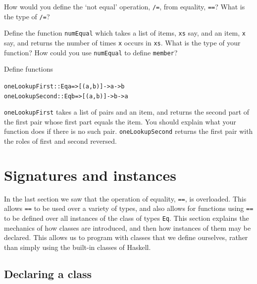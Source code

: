 \begin{exercises}

\item
How would you define the `not equal'
operation, \texttt{/=}, from equality, \texttt{==}? What is the type of
\texttt{/=}?

\item
Define the function \texttt{numEqual} which takes a list of items, \texttt{xs} say,
and an item, \texttt{x} say, and returns the number of times \texttt{x} occurs in
\texttt{xs}. What is the type of your function? How could you use \texttt{numEqual}
to define \texttt{member}?

\item
Define functions
\begin{alltt}
oneLookupFirst  :: Eq a => [ (a,b) ] -> a -> b
oneLookupSecond :: Eq b => [ (a,b) ] -> b -> a
\end{alltt}
\texttt{oneLookupFirst} takes a list of pairs and an item, and returns the second
part of the first pair whose first part equals the item. You
should explain what your function does if there is no such pair. 
\texttt{oneLookupSecond} returns the first pair with the roles of first and second
reversed.
\end{exercises}

\section{Signatures and instances}
\label{sigInsts}

In the last section we saw that the operation of equality, \texttt{==}, 
is overloaded. This allows \texttt{==} to be used over a variety of types, and
also
allows for functions using \texttt{==}
to be defined over all instances of the class of types \texttt{Eq}.
This section explains the mechanics of how classes are introduced, and then
how instances of them may be declared. This allows us to
program with classes that we define ourselves, rather than simply using the
built-in classes of Haskell.


\subsection*{Declaring a class}

